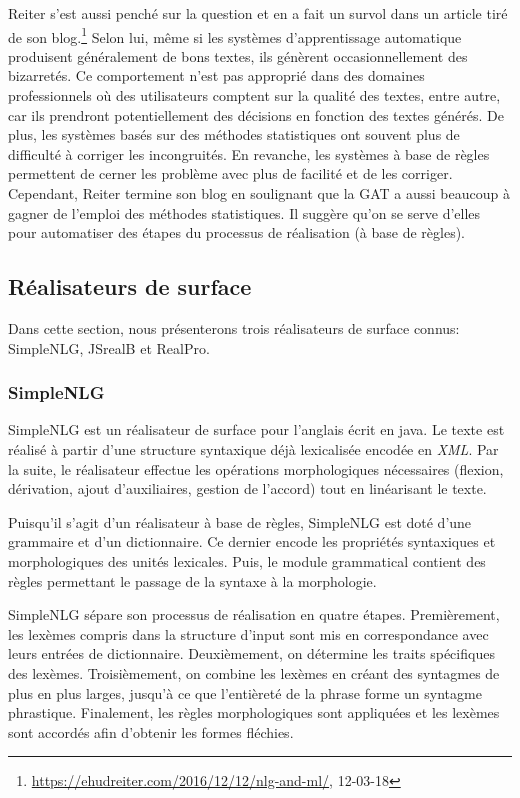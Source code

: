 Reiter s'est aussi penché sur la question et en a fait un survol dans un article tiré de son blog.\footnote{\url{https://ehudreiter.com/2016/12/12/nlg-and-ml/}, 12-03-18} Selon lui, même si les systèmes d'apprentissage automatique produisent généralement de bons textes, ils génèrent occasionnellement des bizarretés. Ce comportement n'est pas approprié dans des domaines professionnels où des utilisateurs comptent sur la qualité des textes, entre autre, car ils prendront potentiellement des décisions en fonction des textes générés. De plus, les systèmes basés sur des méthodes statistiques ont souvent plus de difficulté à corriger les incongruités. En revanche, les systèmes à base de règles permettent de cerner les problème avec plus de facilité et de les corriger. Cependant, Reiter termine son blog en soulignant que la \ac{GAT} a aussi beaucoup à gagner de l'emploi des méthodes statistiques. Il suggère qu'on se serve d'elles pour automatiser des étapes du processus de réalisation (à base de règles).


\subsection{Réalisateurs de surface}

Dans cette section, nous présenterons trois réalisateurs de surface connus: SimpleNLG, JSrealB et RealPro.

\subsubsection{SimpleNLG}
SimpleNLG \citep{GattSimpleNLGRealisationEngine2009} est un réalisateur de surface pour l'anglais écrit en java. Le texte est réalisé à partir d'une structure syntaxique déjà lexicalisée encodée en \emph{XML}. Par la suite, le réalisateur effectue les opérations morphologiques nécessaires (flexion, dérivation, ajout d'auxiliaires, gestion de l'accord) tout en linéarisant le texte.

Puisqu'il s'agit d'un réalisateur à base de règles, SimpleNLG est doté d'une grammaire et d'un dictionnaire. Ce dernier encode les propriétés syntaxiques et morphologiques des unités lexicales. Puis, le module grammatical contient des règles permettant le passage de la syntaxe à la morphologie.

SimpleNLG sépare son processus de réalisation en quatre étapes. Premièrement, les lexèmes compris dans la structure d'input sont mis en correspondance avec leurs entrées de dictionnaire. Deuxièmement, on détermine les traits spécifiques des lexèmes. Troisièmement, on combine les lexèmes en créant des syntagmes de plus en plus larges, jusqu'à ce que l'entièreté de la phrase forme un syntagme phrastique. Finalement, les règles morphologiques sont appliquées et les lexèmes sont accordés afin d'obtenir les formes fléchies.


